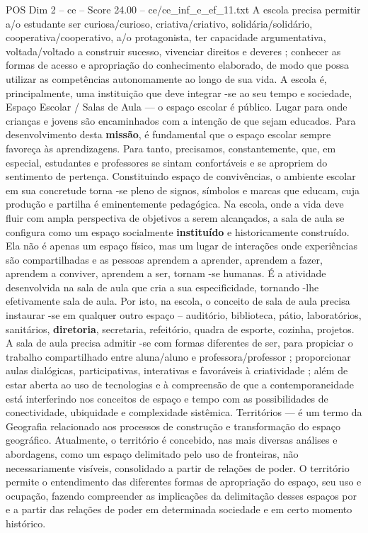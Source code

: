 \begin{textsample}{POS Dim 2 – ce – Score 24.00 – ce/ce\_inf\_e\_ef\_11.txt}
A escola precisa permitir a/o estudante ser curiosa/curioso, criativa/criativo, solidária/solidário, cooperativa/cooperativo, a/o protagonista, ter capacidade argumentativa, voltada/voltado a construir sucesso, vivenciar direitos e deveres ; conhecer as formas de acesso e apropriação do conhecimento elaborado, de modo que possa utilizar as competências autonomamente ao longo de sua vida.
A escola é, principalmente, uma instituição que deve integrar -se ao seu tempo e sociedade, Espaço Escolar / Salas de Aula — o espaço escolar é público.
Lugar para onde crianças e jovens são encaminhados com a intenção de que sejam educados.
Para desenvolvimento desta \textbf{missão}, é fundamental que o espaço escolar sempre favoreça às aprendizagens.
Para tanto, precisamos, constantemente, que, em especial, estudantes e professores se sintam confortáveis e se apropriem do sentimento de pertença.
Constituindo espaço de convivências, o ambiente escolar em sua concretude torna -se pleno de signos, símbolos e marcas que educam, cuja produção e partilha é eminentemente pedagógica.
Na escola, onde a vida deve fluir com ampla perspectiva de objetivos a serem alcançados, a sala de aula se configura como um espaço socialmente \textbf{instituído} e historicamente construído.
Ela não é apenas um espaço físico, mas um lugar de interações onde experiências são compartilhadas e as pessoas aprendem a aprender, aprendem a fazer, aprendem a conviver, aprendem a ser, tornam -se humanas.
É a atividade desenvolvida na sala de aula que cria a sua especificidade, tornando -lhe efetivamente sala de aula.
Por isto, na escola, o conceito de sala de aula precisa instaurar -se em qualquer outro espaço – auditório, biblioteca, pátio, laboratórios, sanitários, \textbf{diretoria}, secretaria, refeitório, quadra de esporte, cozinha, projetos.
A sala de aula precisa admitir -se com formas diferentes de ser, para propiciar o trabalho compartilhado entre aluna/aluno e professora/professor ; proporcionar aulas dialógicas, participativas, interativas e favoráveis à criatividade ; além de estar aberta ao uso de tecnologias e à compreensão de que a contemporaneidade está interferindo nos conceitos de espaço e tempo com as possibilidades de conectividade, ubiquidade e complexidade sistêmica.
Territórios — é um termo da Geografia relacionado aos processos de construção e transformação do espaço geográfico.
Atualmente, o território é concebido, nas mais diversas análises e abordagens, como um espaço delimitado pelo uso de fronteiras, não necessariamente visíveis, consolidado a partir de relações de poder.
O território permite o entendimento das diferentes formas de apropriação do espaço, seu uso e ocupação, fazendo compreender as implicações da delimitação desses espaços por e a partir das relações de poder em determinada sociedade e em certo momento histórico.

\end{textsample}

